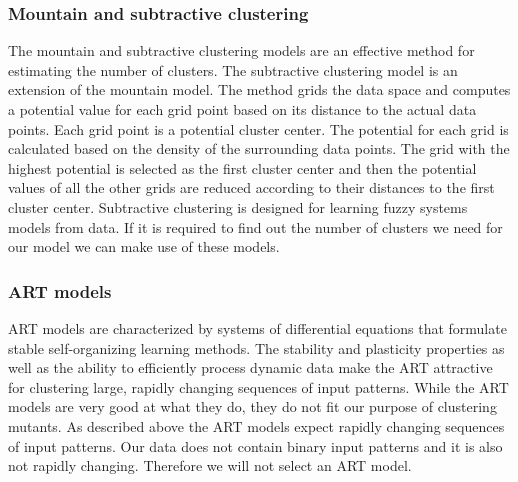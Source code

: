 \documentclass[../../main]{subfiles}
\begin{document}
\subsubsection{Mountain and subtractive clustering}
The mountain and subtractive clustering models are an effective method for estimating the number of clusters\cite{Du2010Clustering:Approach}. 
The subtractive clustering model is an extension of the mountain model\cite{Du2010Clustering:Approach}. 
\newline
The method grids the data space and computes a potential value for each grid point based on its distance to the actual data points. Each grid point is a potential cluster center. The potential for each grid is calculated based on the density of the surrounding data points. The grid with the highest potential is selected as the first cluster center and then the potential values of all the other grids are reduced according to their distances to the first cluster center.
\newline
Subtractive clustering is designed for learning fuzzy systems models from data\cite{Chiu1994FuzzyEstimation}. 
If it is required to find out the number of clusters we need for our model we can make use of these models.

\subsubsection{ART models}
ART models are characterized by systems of differential equations that formulate stable self-organizing learning methods\cite{Du2010Clustering:Approach}.
The stability and plasticity properties as well as the ability to efficiently process dynamic data make the ART attractive for clustering large, rapidly changing sequences of input patterns\cite{Du2010Clustering:Approach}.
While the ART models are very good at what they do, they do not fit our purpose of clustering mutants.
As described above the ART models expect rapidly changing sequences of input patterns.
Our data does not contain binary input patterns and it is also not rapidly changing.
Therefore we will not select an ART model.
\end{document}
